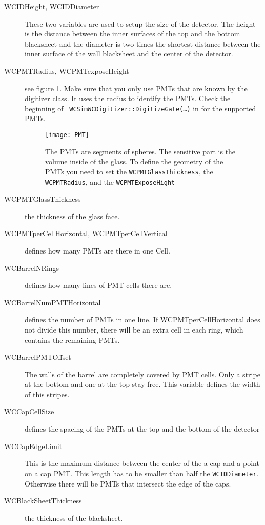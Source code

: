 \begin{description}
\item[WCIDHeight, WCIDDiameter] These two variables are used to setup the size of the detector. The height is the distance between the inner surfaces of the top and the bottom blacksheet and the diameter is two times the shortest distance between the inner surface of the wall blacksheet and the center of the detector.

\item[WCPMTRadius, WCPMTexposeHeight] see figure \ref{fig:pmt}. Make sure that you only use PMTs that are known by the digitizer class. It uses the radius to identify the PMTs. Check the beginning of \texttt{ WCSimWCDigitizer::DigitizeGate(\ldots)} in  for the supported PMTs.


\begin{figure}
  \begin{center}
    \texttt{[image: PMT]}
  \end{center}
\caption{The PMTs are segments of spheres. The sensitive part is the volume inside of the glass. To define the geometry of the PMTs you need to set the \texttt{WCPMTGlassThickness}, the \texttt{WCPMTRadius}, and the \texttt{WCPMTExposeHight}}\label{fig:pmt}
\end{figure}

\item[WCPMTGlassThickness] the thickness of the glass face.

\item[WCPMTperCellHorizontal, WCPMTperCellVertical] defines how many PMTs are there in one Cell.

\item[WCBarrelNRings] defines how many lines of PMT cells there are. 

\item[WCBarrelNumPMTHorizontal] defines the number of PMTs in one line. If WCPMTperCellHorizontal does not divide this number, there will be an extra cell in each ring, which contains the remaining PMTs.

\item[WCBarrelPMTOffset] The walls of the barrel are completely covered by PMT cells. Only a stripe at the bottom and one at the top stay free. This variable defines the width of this stripes.

\item[WCCapCellSize] defines the spacing of the PMTs at the top and the bottom of the detector

\item[WCCapEdgeLimit] This is the maximum distance between the center of the a cap and a point on a cap PMT. This length has to be smaller than half the \texttt{WCIDDiameter}. Otherwise there will be PMTs that intersect the edge of the caps.

\item[WCBlackSheetThickness] the thickness of the blacksheet.
\end {description}

